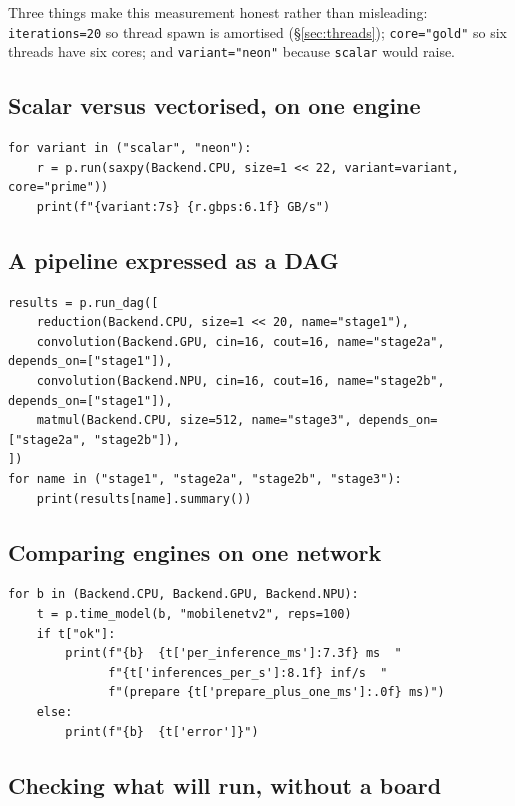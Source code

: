 \documentclass[11pt,a4paper]{article}
\newcommand{\code}[1]{\texttt{\let\_\breakableunderscore #1}}
\newcommand{\breakableunderscore}{\textunderscore\allowbreak}
\begin{document}
\noindent Three things make this measurement honest rather than misleading:
\code{iterations=20} so thread spawn is amortised (\S\ref{sec:threads});
\code{core="gold"} so six threads have six cores; and \code{variant="neon"}
because \code{scalar} would raise.

\subsection{Scalar versus vectorised, on one engine}

\begin{lstlisting}
for variant in ("scalar", "neon"):
    r = p.run(saxpy(Backend.CPU, size=1 << 22, variant=variant, core="prime"))
    print(f"{variant:7s} {r.gbps:6.1f} GB/s")
\end{lstlisting}

\subsection{A pipeline expressed as a DAG}

\begin{lstlisting}
results = p.run_dag([
    reduction(Backend.CPU, size=1 << 20, name="stage1"),
    convolution(Backend.GPU, cin=16, cout=16, name="stage2a", depends_on=["stage1"]),
    convolution(Backend.NPU, cin=16, cout=16, name="stage2b", depends_on=["stage1"]),
    matmul(Backend.CPU, size=512, name="stage3", depends_on=["stage2a", "stage2b"]),
])
for name in ("stage1", "stage2a", "stage2b", "stage3"):
    print(results[name].summary())
\end{lstlisting}

\subsection{Comparing engines on one network}

\begin{lstlisting}
for b in (Backend.CPU, Backend.GPU, Backend.NPU):
    t = p.time_model(b, "mobilenetv2", reps=100)
    if t["ok"]:
        print(f"{b}  {t['per_inference_ms']:7.3f} ms  "
              f"{t['inferences_per_s']:8.1f} inf/s  "
              f"(prepare {t['prepare_plus_one_ms']:.0f} ms)")
    else:
        print(f"{b}  {t['error']}")
\end{lstlisting}

\subsection{Checking what will run, without a board}
\end{document}
